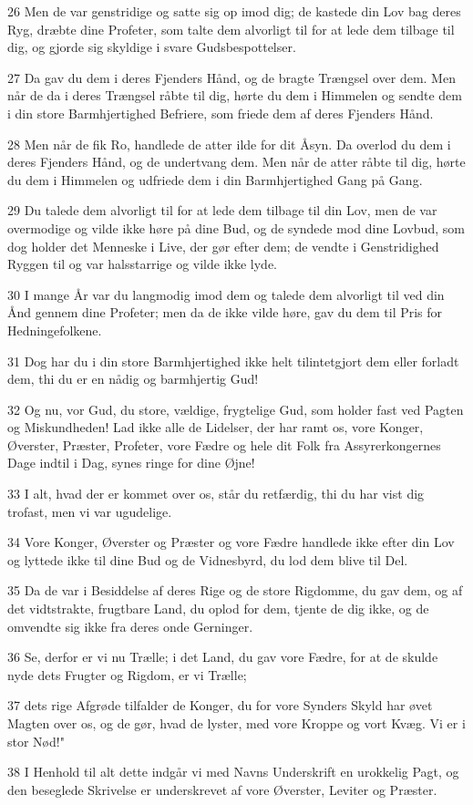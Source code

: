 \par 26 Men de var genstridige og satte sig op imod dig; de kastede din Lov bag deres Ryg, dræbte dine Profeter, som talte dem alvorligt til for at lede dem tilbage til dig, og gjorde sig skyldige i svare Gudsbespottelser.
\par 27 Da gav du dem i deres Fjenders Hånd, og de bragte Trængsel over dem. Men når de da i deres Trængsel råbte til dig, hørte du dem i Himmelen og sendte dem i din store Barmhjertighed Befriere, som friede dem af deres Fjenders Hånd.
\par 28 Men når de fik Ro, handlede de atter ilde for dit Åsyn. Da overlod du dem i deres Fjenders Hånd, og de undertvang dem. Men når de atter råbte til dig, hørte du dem i Himmelen og udfriede dem i din Barmhjertighed Gang på Gang.
\par 29 Du talede dem alvorligt til for at lede dem tilbage til din Lov, men de var overmodige og vilde ikke høre på dine Bud, og de syndede mod dine Lovbud, som dog holder det Menneske i Live, der gør efter dem; de vendte i Genstridighed Ryggen til og var halsstarrige og vilde ikke lyde.
\par 30 I mange År var du langmodig imod dem og talede dem alvorligt til ved din Ånd gennem dine Profeter; men da de ikke vilde høre, gav du dem til Pris for Hedningefolkene.
\par 31 Dog har du i din store Barmhjertighed ikke helt tilintetgjort dem eller forladt dem, thi du er en nådig og barmhjertig Gud!
\par 32 Og nu, vor Gud, du store, vældige, frygtelige Gud, som holder fast ved Pagten og Miskundheden! Lad ikke alle de Lidelser, der har ramt os, vore Konger, Øverster, Præster, Profeter, vore Fædre og hele dit Folk fra Assyrerkongernes Dage indtil i Dag, synes ringe for dine Øjne!
\par 33 I alt, hvad der er kommet over os, står du retfærdig, thi du har vist dig trofast, men vi var ugudelige.
\par 34 Vore Konger, Øverster og Præster og vore Fædre handlede ikke efter din Lov og lyttede ikke til dine Bud og de Vidnesbyrd, du lod dem blive til Del.
\par 35 Da de var i Besiddelse af deres Rige og de store Rigdomme, du gav dem, og af det vidtstrakte, frugtbare Land, du oplod for dem, tjente de dig ikke, og de omvendte sig ikke fra deres onde Gerninger.
\par 36 Se, derfor er vi nu Trælle; i det Land, du gav vore Fædre, for at de skulde nyde dets Frugter og Rigdom, er vi Trælle;
\par 37 dets rige Afgrøde tilfalder de Konger, du for vore Synders Skyld har øvet Magten over os, og de gør, hvad de lyster, med vore Kroppe og vort Kvæg. Vi er i stor Nød!"
\par 38 I Henhold til alt dette indgår vi med Navns Underskrift en urokkelig Pagt, og den beseglede Skrivelse er underskrevet af vore Øverster, Leviter og Præster.

